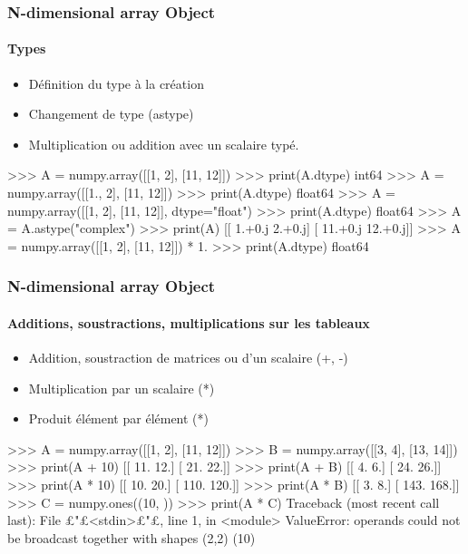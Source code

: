 \begin{frame}[fragile]
\frametitle{N-dimensional array Object}
\framesubtitle{Types}
\begin{itemize}
 \item Définition du type à la création
 \item Changement de type (astype)
 \item Multiplication ou addition avec un scalaire typé. 
\end{itemize}
\begin{pythonConsole}
>>> A = numpy.array([[1, 2], [11, 12]])
>>> print(A.dtype)
int64
>>> A = numpy.array([[1., 2], [11, 12]])
>>> print(A.dtype)
float64
>>> A = numpy.array([[1, 2], [11, 12]], dtype="float")
>>> print(A.dtype)
float64
>>> A = A.astype("complex")
>>> print(A)
[[  1.+0.j   2.+0.j]
 [ 11.+0.j  12.+0.j]]
>>> A = numpy.array([[1, 2], [11, 12]]) * 1.
>>> print(A.dtype)
float64
\end{pythonConsole}
\end{frame}
\begin{frame}[fragile]
\frametitle{N-dimensional array Object}
\framesubtitle{Additions, soustractions, multiplications sur les tableaux}
\begin{itemize}
 \item Addition, soustraction de matrices ou d'un scalaire (+, -)
 \item Multiplication par un scalaire (*)
 \item Produit élément par élément (*) 
\end{itemize}
\begin{pythonConsole}
>>> A = numpy.array([[1, 2], [11, 12]])
>>> B = numpy.array([[3, 4], [13, 14]])
>>> print(A + 10)
[[ 11.  12.]
 [ 21.  22.]]
>>> print(A + B)
[[  4.   6.]
 [ 24.  26.]]
>>> print(A * 10)
[[  10.   20.]
 [ 110.  120.]]
>>> print(A * B)
[[   3.    8.]
 [ 143.  168.]]
>>> C = numpy.ones((10, ))
>>> print(A * C)
Traceback (most recent call last):
  File £"£<stdin>£"£, line 1, in <module>
ValueError: operands could not be broadcast together with shapes (2,2) (10) 
\end{pythonConsole}
\end{frame}
